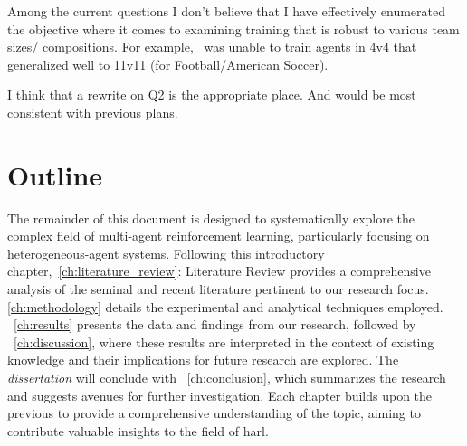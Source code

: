\begin{comment}
    
\end{comment}

\begin{tcolorbox}[colback=blue!5,colframe=blue!50!black,title=Note to Editor]
    Among the current questions I don't believe that I have effectively enumerated the
    objective where it comes to examining training that is robust to various team sizes/
    compositions. For example,~\cite*{smit2023} was unable to train agents in 4v4 that generalized
    well to 11v11 (for Football/American Soccer).

    I think that a rewrite on Q2 is the appropriate place. 
    And would be most consistent with previous plans.
\end{tcolorbox}

\section{Outline}

The remainder of this document is designed to systematically explore the complex field of 
multi-agent reinforcement learning, particularly focusing on heterogeneous-agent systems.
Following this introductory chapter,~\ref*{ch:literature_review}: Literature Review provides a 
comprehensive analysis of the seminal and recent literature pertinent to our research focus.%
\ref*{ch:methodology} details the experimental and analytical techniques employed.
~\ref*{ch:results} presents the data and findings from our research, followed by 
~\ref*{ch:discussion}, where these results are interpreted in the context of existing 
knowledge and their implications for future research are explored.
The \emph{dissertation} will conclude with
~\ref*{ch:conclusion}, which summarizes the research and suggests avenues for further investigation. 
Each chapter builds upon the previous to provide a comprehensive understanding of the topic, 
aiming to contribute valuable insights to the field of \gls*{harl}.

